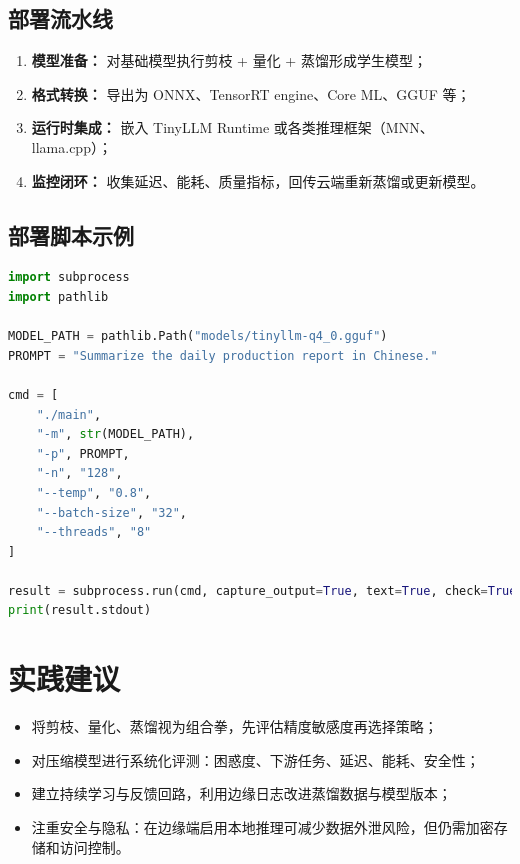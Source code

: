 \documentclass[UTF8,zihao=-4]{ctexart}
\begin{document}
\subsection{部署流水线}
\begin{enumerate}
  \item \textbf{模型准备：} 对基础模型执行剪枝 + 量化 + 蒸馏形成学生模型；
  \item \textbf{格式转换：} 导出为 ONNX、TensorRT engine、Core ML、GGUF 等；
  \item \textbf{运行时集成：} 嵌入 TinyLLM Runtime 或各类推理框架（MNN、llama.cpp）；
  \item \textbf{监控闭环：} 收集延迟、能耗、质量指标，回传云端重新蒸馏或更新模型。
\end{enumerate}

\subsection{部署脚本示例}
\begin{lstlisting}[language=Python,caption={使用 llama.cpp 推理量化模型}]
import subprocess
import pathlib

MODEL_PATH = pathlib.Path("models/tinyllm-q4_0.gguf")
PROMPT = "Summarize the daily production report in Chinese."

cmd = [
    "./main",
    "-m", str(MODEL_PATH),
    "-p", PROMPT,
    "-n", "128",
    "--temp", "0.8",
    "--batch-size", "32",
    "--threads", "8"
]

result = subprocess.run(cmd, capture_output=True, text=True, check=True)
print(result.stdout)
\end{lstlisting}

\section*{实践建议}
\begin{itemize}
  \item 将剪枝、量化、蒸馏视为组合拳，先评估精度敏感度再选择策略；
  \item 对压缩模型进行系统化评测：困惑度、下游任务、延迟、能耗、安全性；
  \item 建立持续学习与反馈回路，利用边缘日志改进蒸馏数据与模型版本；
  \item 注重安全与隐私：在边缘端启用本地推理可减少数据外泄风险，但仍需加密存储和访问控制。
\end{itemize}
\end{document}
